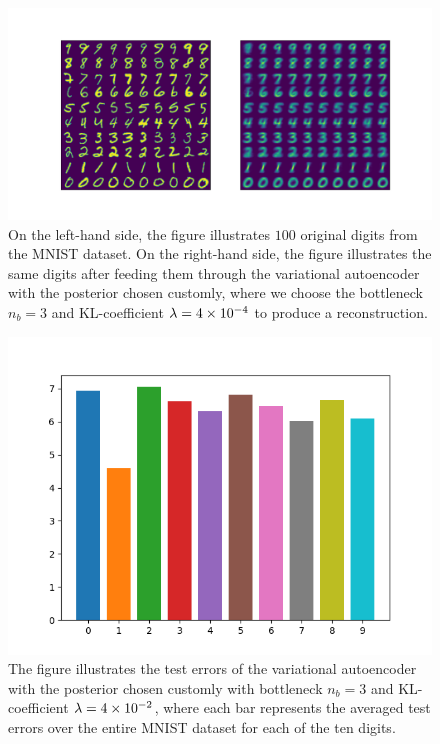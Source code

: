 \begin{figure}
\begin{center}
      \includegraphics[trim = 15mm 10mm 15mm 15mm, clip, width=\linewidth]{convolutional_VAE_new_idea_KL_4e-2_10k_epochs_3D_inference}
\end{center}
\caption{On the left-hand side, the figure illustrates $100$ original digits from the MNIST dataset. On the right-hand side, the figure illustrates the same digits after feeding them through the variational autoencoder with the posterior chosen customly, where we choose the bottleneck $n_b=3$ and KL-coefficient $\lambda = \num{4e-4}$ to produce a reconstruction.}\label{fig:convolutional_VAE_new_idea_KL_4e-2_10k_epochs_3D_inference}
\end{figure}


\begin{figure}
\begin{center}
      \includegraphics[width=0.49\linewidth]{convolutional_VAE_new_idea_KL_4e-2_10k_epochs_3D_errors}
\end{center}
\caption{The figure illustrates the test errors of the variational autoencoder with the posterior chosen customly with bottleneck $n_b=3$ and KL-coefficient $\lambda = \num{4e-2}$, where each bar represents the averaged test errors over the entire MNIST dataset for each of the ten digits.}\label{fig:convolutional_VAE_new_idea_KL_4e-2_10k_epochs_3D_errors}
\end{figure}


